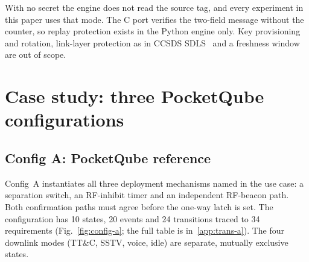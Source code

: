 \documentclass[preprint,12pt]{elsarticle}
\newcommand{\cfgA}{Config~A}
\newcommand{\ttc}{TT\&C}
\begin{document}
With no secret the engine does not read the source tag, and every experiment in this paper uses that mode. The C port verifies the two-field message without the counter, so replay protection exists in the Python engine only. Key provisioning and rotation, link-layer protection as in CCSDS SDLS~\cite{CCSDS2022SDLS} and a freshness window are out of scope.

\section{Case study: three PocketQube configurations}\label{sec:configs}

\subsection{Config A: PocketQube reference}

\cfgA{} instantiates all three deployment mechanisms named in the use case: a separation switch, an RF-inhibit timer and an independent RF-beacon path. Both confirmation paths must agree before the one-way  latch is set. The configuration has 10 states, 20 events and 24 transitions traced to 34 requirements (Fig.~\ref{fig:config-a}; the full table is in~\ref{app:trans-a}). The four downlink modes (\ttc{}, SSTV, voice, idle) are separate, mutually exclusive states.
\end{document}
